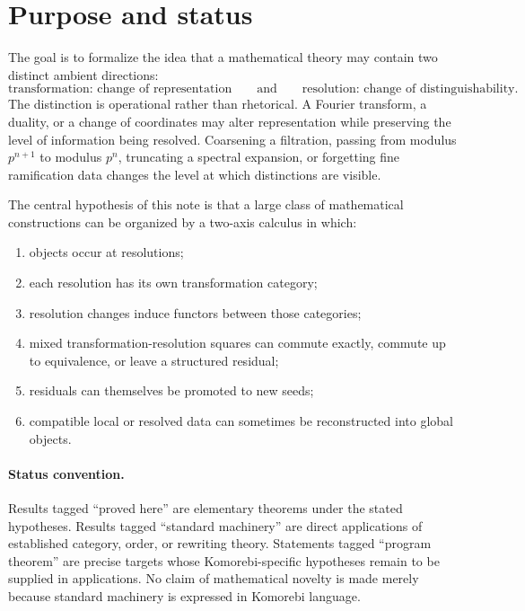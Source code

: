 \documentclass[11pt]{article}
\theoremstyle{definition}
\theoremstyle{remark}
\begin{document}
\tableofcontents
\newpage

\section{Purpose and status}

The goal is to formalize the idea that a mathematical theory may contain two distinct ambient directions:
\[
\boxed{\text{transformation: change of representation}}
\qquad\text{and}\qquad
\boxed{\text{resolution: change of distinguishability}.}
\]
The distinction is operational rather than rhetorical. A Fourier transform, a duality, or a change of coordinates may alter representation while preserving the level of information being resolved. Coarsening a filtration, passing from modulus $p^{n+1}$ to modulus $p^n$, truncating a spectral expansion, or forgetting fine ramification data changes the level at which distinctions are visible.

The central hypothesis of this note is that a large class of mathematical constructions can be organized by a two-axis calculus in which:
\begin{enumerate}
    \item objects occur at resolutions;
    \item each resolution has its own transformation category;
    \item resolution changes induce functors between those categories;
    \item mixed transformation-resolution squares can commute exactly, commute up to equivalence, or leave a structured residual;
    \item residuals can themselves be promoted to new seeds;
    \item compatible local or resolved data can sometimes be reconstructed into global objects.
\end{enumerate}

\paragraph{Status convention.}
Results tagged ``proved here'' are elementary theorems under the stated hypotheses. Results tagged ``standard machinery'' are direct applications of established category, order, or rewriting theory. Statements tagged ``program theorem'' are precise targets whose Komorebi-specific hypotheses remain to be supplied in applications. No claim of mathematical novelty is made merely because standard machinery is expressed in Komorebi language.
\end{document}
